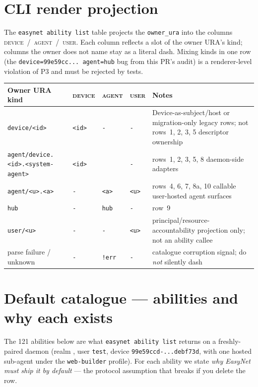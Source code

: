 \documentclass[10pt,a4paper]{article}
\newcommand{\code}[1]{\texttt{\small #1}}
\begin{document}
\section{CLI render projection}

The \code{easynet ability list} table projects the
\code{owner\_ura} into the columns
\textsc{device}~/~\textsc{agent}~/~\textsc{user}. Each column reflects
a slot of the owner URA's kind; columns the owner does not name stay
as a literal dash. Mixing kinds in one row (the
\code{device=99e59cc... agent=hub} bug from this PR's audit) is a
renderer-level violation of P3 and must be rejected by tests.

\begin{tabularx}{\linewidth}{l l l l X}
  \toprule
  \textbf{Owner URA kind} & \textsc{device} & \textsc{agent} & \textsc{user} & \textbf{Notes} \\
  \midrule
  \code{device/<id>}            & \code{<id>} & \code{-}    & \code{-}    & Device-as-subject/host or migration-only legacy rows; not rows~1, 2, 3, 5 descriptor ownership \\
  \code{agent/device.<id>.<system-agent>} & \code{<id>} & \code{<system-agent>} & \code{-} & rows~1, 2, 3, 5, 8 daemon-side adapters \\
  \code{agent/<u>.<a>}          & \code{-}    & \code{<a>}  & \code{<u>}  & rows~4, 6, 7, 8a, 10 callable user-hosted agent surfaces \\
  \code{hub}                    & \code{-}    & \code{hub}  & \code{-}    & row~9 \\
  \code{user/<u>}               & \code{-}    & \code{-}    & \code{<u>}  & principal/resource-accountability projection only; not an ability callee \\
  parse failure / unknown       & \code{-}    & \code{!err} & \code{-}    & catalogue corruption signal; do \emph{not} silently dash \\
  \bottomrule
\end{tabularx}

\section{Default catalogue --- abilities and why each exists}

The 121 abilities below are what \code{easynet ability list} returns
on a freshly-paired daemon (realm , user \code{test},
device \code{99e59ccd-...debf73d}, with one hosted sub-agent under the
\code{web-builder} profile). For each ability we state \emph{why
EasyNet must ship it by default} --- the protocol assumption that
breaks if you delete the row.
\end{document}
